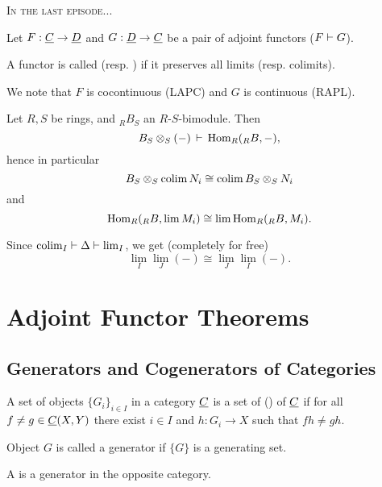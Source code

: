 
\textsc{In the last episode...}

\vspace*{2mm}

Let \( F: \underline{C} \to \underline{D} \) and \( G: \underline{D} \to \underline{C} \) be a pair of adjoint functors (\( F \mathrel{\vdash} G \)).

\begin{definition*}
	A functor is called  (resp. ) if it preserves all limits (resp. colimits).
\end{definition*}

We note that \( F \) is cocontinuous (LAPC) and \( G \) is continuous (RAPL).

\begin{examples*}
	\item Let \( R, S \) be rings, and \( _R B_S \) an \( R \)-\( S \)-bimodule. Then
		\[
			B_S \otimes_S (-) \,\mathrel{\vdash}\, \operatorname{Hom}_R(_R B, -),
		\]
		hence in particular
		\[
			B_S \otimes_S \operatorname{colim} N_i \cong \operatorname{colim} B_S \otimes_S N_i
		\]
		and
		\[
			\operatorname{Hom}_R(_R B, \lim M_i) \cong \lim \operatorname{Hom}_R (_R B, M_i).
		\]
	\item Since \( \operatorname{colim}_I \mathrel{\vdash} \Delta \mathrel{\vdash} \lim_I \), we get (completely for free)
		\[
			\lim_I \lim_J(-) \cong \lim_J \lim_I (-).
		\]
\end{examples*}

\chapter{Adjoint Functor Theorems}

\section{Generators and Cogenerators of Categories}

\begin{definitions*}
	\item A set of objects \( \{G_i\}_{i \in I} \) in a category \( \underline{C} \) is a set of  () of \( \underline{C} \) if for all \( f \neq g \in \underline{C}(X, Y) \) there exist \( i \in I \) and \( h: G_i \to X \) such that \( fh \neq gh \).
	\item Object \( G \) is called a generator if \( \{G\} \) is a generating set.
	\item A  is a generator in the opposite category.
\end{definitions*}

